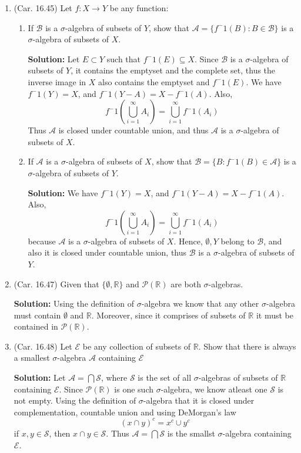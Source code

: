 \documentclass{article}
\def\to{\rightarrow}
\def\RR{\mathbb R}
\begin{document}
\begin{enumerate}
\item (Car. 16.45) Let $f: X\to Y$ be any function:
  \begin{enumerate}
  \item If $\mathcal{B}$ is a $\sigma$-algebra of subsets of $Y$, show that $\mathcal{A} = \{f^-1(B):
    B \in \mathcal{B}\}$ is a $\sigma$-algebra of subsets of $X$.

\textbf{Solution:}     
Let $E\subset Y$ such that $f^-1(E) \subseteq X$. 
Since $\mathcal{B}$ is a $\sigma$-algebra of subsets of $Y$, it contains
the emptyset and the complete set, thus the inverse image in $X$
also contains the emptyset and $f^-1(E)$. 
We have $f^-1(Y) = X$, and $f^-1(Y-A) = X - f^-1(A)$. Also, 
\[
f^-1( \bigcup_{i=1}^\infty A_i ) = \bigcup_{i=1}^\infty f^-1(A_i) 
\]
Thus $\mathcal{A}$ is closed under countable union, and thus
$\mathcal{A}$ is a $\sigma$-algebra of subsets of $X$.

  \item If $\mathcal{A}$ is a $\sigma$-algebra of subsets of $X$, show that $\mathcal{B} = \{B: f^-1(B)
    \in \mathcal{A}\}$ is a $\sigma$-algebra of subsets of $Y$.

\textbf{Solution:}     
We have $f^-1(Y) = X$, and $f^-1(Y-A) = X - f^-1(A)$. Also, 
\[
f^-1( \bigcup_{i=1}^\infty A_i ) = \bigcup_{i=1}^\infty f^-1(A_i) 
\]
because $\mathcal{A}$ is a $\sigma$-algebra of subsets of $X$.
Hence,
$\emptyset,Y$ belong to $\mathcal{B}$, and also it is closed under
countable union, thus $\mathcal{B}$ is a $\sigma$-algebra of subsets of $Y$.

    \end{enumerate}

\item (Car. 16.47) Given that $\{\emptyset,\RR\}$ and $\mathcal{P}(\RR)$
are both $\sigma$-algebras. 

\textbf{Solution:} Using the definition of $\sigma$-algebra we know
that any other $\sigma$-algebra must contain $\emptyset$ and $\RR$.
Moreover, since it comprises of subsets of $\RR$ it must be contained
in $\mathcal{P}(\RR)$.

\item (Car. 16.48) Let $\mathcal{E}$ be any collection of subsets of $\RR$.
Show that there is always a smallest $\sigma$-algebra $\mathcal{A}$ 
containing $\mathcal{E}$

\textbf{Solution:} 
Let $\mathcal{A}=\bigcap \mathcal{S}$,
where $\mathcal{S}$ is the set of all $\sigma$-algebras of subsets of
$\RR$ containing $\mathcal{E}$. Since $\mathcal{P}(\RR)$ is one
such $\sigma$-algebra, we know atleast one $\mathcal{S}$ is not empty.
Using the definition of $\sigma$-algebra that it is closed under
complementation, countable union and using DeMorgan's law
\[
(x \cap y)^c = x^c \cup y^c
\]
if $x,y\in\mathcal{S}$, then $x\cap y \in \mathcal{S}$. Thus
$\mathcal{A}=\bigcap\mathcal{S}$ is the smallst $\sigma$-algebra
containing $\mathcal{E}$.


\end{enumerate}
\end{document}
